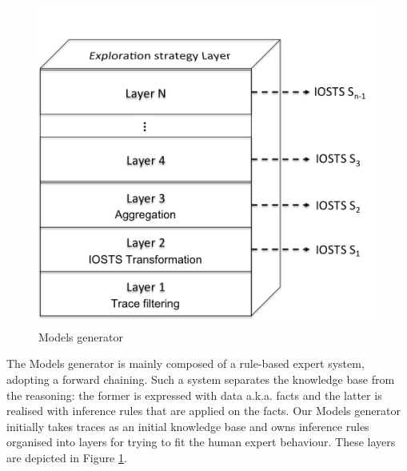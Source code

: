 \begin{figure}[ht]
    \begin{center}
        \includegraphics[width=1.0\linewidth]{figures/se.png}
    \end{center}
    \caption {Models generator}
    \label{fig:se}
\end{figure}

The Models generator is mainly composed of a rule-based expert
system, adopting a forward chaining. Such a system separates the
knowledge base from the reasoning: the former is expressed with
data a.k.a. facts and the latter is realised with inference rules
that are applied on the facts. Our Models generator initially
takes traces as an initial knowledge base and owns inference
rules organised into layers for trying to fit the human expert
behaviour. These layers are depicted in Figure \ref{fig:se}.

